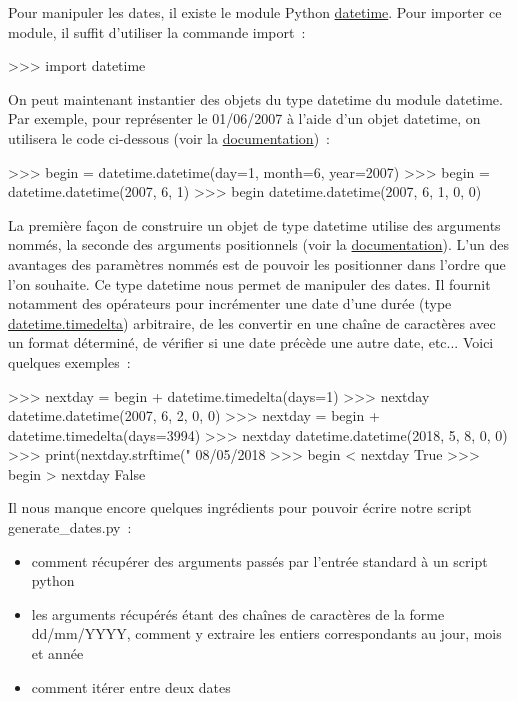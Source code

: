 Pour manipuler les dates, il existe le module Python \href{http://docs.python.org/2/library/datetime.html}{datetime}. Pour importer ce module, il suffit d'utiliser la commande import~:
\begin{exempleResultat}
>>> import datetime
\end{exempleResultat}
On peut maintenant instantier des objets du type datetime du module datetime. Par exemple, pour représenter le 01/06/2007 à l'aide d'un objet datetime, on utilisera le code ci-dessous (voir la \href{http://docs.python.org/2/library/datetime.html#datetime.datetime}{documentation})~:
\begin{exempleResultat}
>>> begin = datetime.datetime(day=1, month=6, year=2007)
>>> begin = datetime.datetime(2007, 6, 1)
>>> begin
datetime.datetime(2007, 6, 1, 0, 0)
\end{exempleResultat}
La première façon de construire un objet de type datetime utilise des arguments nommés, la seconde des arguments positionnels (voir la \href{http://docs.python.org/2/glossary.html#term-argument}{documentation}). L'un des avantages des paramètres nommés est de pouvoir les positionner dans l'ordre que l'on souhaite. Ce type datetime nous permet de manipuler des dates. Il fournit notamment des opérateurs pour incrémenter une date d'une durée (type \href{http://docs.python.org/2/library/datetime.html#datetime.timedelta}{datetime.timedelta}) arbitraire, de les convertir en une chaîne de caractères avec un format déterminé, de vérifier si une date précède une autre date, etc... Voici quelques exemples~:
\begin{exempleResultat}
>>> nextday = begin + datetime.timedelta(days=1)
>>> nextday
datetime.datetime(2007, 6, 2, 0, 0)
>>> nextday = begin + datetime.timedelta(days=3994)
>>> nextday
datetime.datetime(2018, 5, 8, 0, 0)
>>> print(nextday.strftime("%
08/05/2018
>>> begin < nextday
True
>>> begin > nextday
False
\end{exempleResultat}
Il nous manque encore quelques ingrédients pour pouvoir écrire notre script generate\_dates.py~:
\begin{itemize}
\item comment récupérer des arguments passés par l'entrée standard à un script python
\item les arguments récupérés étant des chaînes de caractères de la forme dd/mm/YYYY, comment y extraire les entiers correspondants au jour, mois et année
\item comment itérer entre deux dates
\end{itemize}
